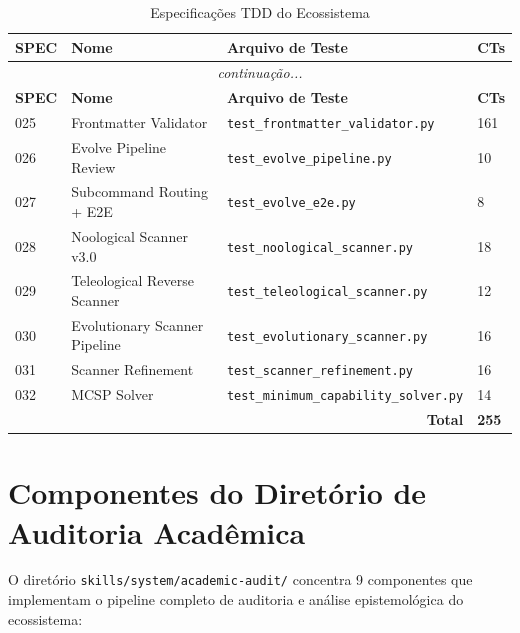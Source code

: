 \begin{longtable}{p{2cm}p{5cm}p{5cm}p{2cm}}
\caption{Especificações TDD do Ecossistema}
\label{tab:specs-tdd}
\toprule
\textbf{SPEC} & \textbf{Nome} & \textbf{Arquivo de Teste} & \textbf{CTs} \\
\midrule
\endfirsthead
\multicolumn{4}{c}{\textit{continuação...}} \\
\toprule
\textbf{SPEC} & \textbf{Nome} & \textbf{Arquivo de Teste} & \textbf{CTs} \\
\midrule
\endhead
025 & Frontmatter Validator & \texttt{test\_frontmatter\_validator.py} & 161 \\
026 & Evolve Pipeline Review & \texttt{test\_evolve\_pipeline.py} & 10 \\
027 & Subcommand Routing + E2E & \texttt{test\_evolve\_e2e.py} & 8 \\
028 & Noological Scanner v3.0 & \texttt{test\_noological\_scanner.py} & 18 \\
029 & Teleological Reverse Scanner & \texttt{test\_teleological\_scanner.py} & 12 \\
030 & Evolutionary Scanner Pipeline & \texttt{test\_evolutionary\_scanner.py} & 16 \\
031 & Scanner Refinement & \texttt{test\_scanner\_refinement.py} & 16 \\
032 & MCSP Solver & \texttt{test\_minimum\_capability\_solver.py} & 14 \\
\bottomrule
\multicolumn{3}{r}{\textbf{Total}} & \textbf{255} \\
\end{longtable}

\section{Componentes do Diretório de Auditoria Acadêmica}

O diretório \texttt{skills/system/academic-audit/} concentra 9 componentes que implementam o pipeline completo de auditoria e análise epistemológica do ecossistema:


